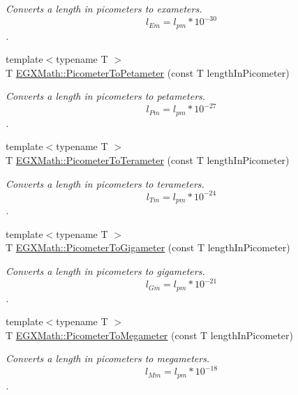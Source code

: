 \begin{DoxyCompactItemize}
\begin{DoxyCompactList}\small\item\em Converts a length in picometers to exameters. \[ l_{Em}=l_{pm} * 10^{-30} \]. \end{DoxyCompactList}\item 
{\footnotesize template$<$typename T $>$ }\\T \mbox{\hyperlink{group___e_g_x_math-_conversions-_length_conversions-_picometer-_s_i_ga491c4ac277c5b63710e9d11aa4b1ecc4}{E\+G\+X\+Math\+::\+Picometer\+To\+Petameter}} (const T length\+In\+Picometer)
\begin{DoxyCompactList}\small\item\em Converts a length in picometers to petameters. \[ l_{Pm}=l_{pm} * 10^{-27} \]. \end{DoxyCompactList}\item 
{\footnotesize template$<$typename T $>$ }\\T \mbox{\hyperlink{group___e_g_x_math-_conversions-_length_conversions-_picometer-_s_i_ga208383d9423614bbd8ddf3731114e31e}{E\+G\+X\+Math\+::\+Picometer\+To\+Terameter}} (const T length\+In\+Picometer)
\begin{DoxyCompactList}\small\item\em Converts a length in picometers to terameters. \[ l_{Tm}=l_{pm} * 10^{-24} \]. \end{DoxyCompactList}\item 
{\footnotesize template$<$typename T $>$ }\\T \mbox{\hyperlink{group___e_g_x_math-_conversions-_length_conversions-_picometer-_s_i_ga9dbf38a2c9eb2f88b4e5061861ec42de}{E\+G\+X\+Math\+::\+Picometer\+To\+Gigameter}} (const T length\+In\+Picometer)
\begin{DoxyCompactList}\small\item\em Converts a length in picometers to gigameters. \[ l_{Gm}=l_{pm} * 10^{-21} \]. \end{DoxyCompactList}\item 
{\footnotesize template$<$typename T $>$ }\\T \mbox{\hyperlink{group___e_g_x_math-_conversions-_length_conversions-_picometer-_s_i_gacf6647b0c2ac985376601d5095fa1624}{E\+G\+X\+Math\+::\+Picometer\+To\+Megameter}} (const T length\+In\+Picometer)
\begin{DoxyCompactList}\small\item\em Converts a length in picometers to megameters. \[ l_{Mm}=l_{pm} * 10^{-18} \]. \end{DoxyCompactList}\item 

\end{DoxyCompactItemize}

